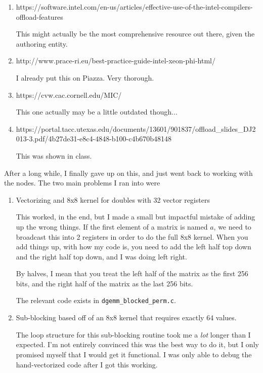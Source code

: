 \documentclass[11pt]{article}
\begin{document}
\begin{enumerate}
    \item https://software.intel.com/en-us/articles/effective-use-of-the-intel-compilers-offload-features

    This might actually be the most comprehensive resource out there, given the authoring entity.

    \item http://www.prace-ri.eu/best-practice-guide-intel-xeon-phi-html/

    I already put this on Piazza.  Very thorough.

    \item https://cvw.cac.cornell.edu/MIC/

    This one actually may be a little outdated though...

    \item https://portal.tacc.utexas.edu/documents/13601/901837/offload\_slides\_DJ2013-3.pdf/4b27de31-e8c4-4848-b100-c4b670b48148

    This was shown in class.
\end{enumerate}

\noindent After a long while, I finally gave up on this, and just went back to working with the nodes.  The two main problems I ran into were

\begin{enumerate}[1.]
    \item Vectorizing and 8x8 kernel for doubles with 32 vector registers

    This worked, in the end, but I made a small but impactful mistake of adding up the wrong things.  If the first element of a matrix is named $a$, we need to broadcast this into 2 registers in order to do the full 8x8 kernel.  When you add things up, with how my code is, you need to add the left half top down and the right half top down, and I was doing left right.

    By halves, I mean that you treat the left half of the matrix as the first 256 bits, and the right half of the matrix as the last 256 bits.

    The relevant code exists in \texttt{dgemm\_blocked\_perm.c}.

    \item Sub-blocking based off of an 8x8 kernel that requires exactly 64 values.

    The loop structure for this sub-blocking routine took me a \emph{lot} longer than I expected.  I'm not entirely convinced this was the best way to do it, but I only promised myself that I would get it functional.  I was only able to debug the hand-vectorized code after I got this working.
\end{enumerate}
\end{document}
